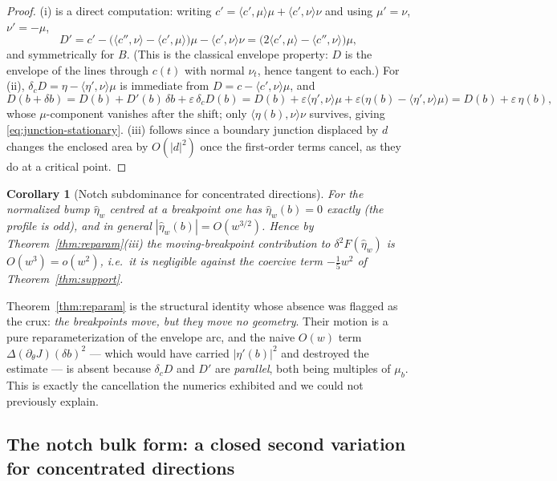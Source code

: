 \documentclass[11pt]{amsart}
\theoremstyle{plain}
\newtheorem{corollary}[theorem]{Corollary}
\theoremstyle{definition}
\begin{document}
\begin{proof}
(i) is a direct computation: writing $c' = \langle c',\mu\rangle\mu +
\langle c',\nu\rangle\nu$ and using $\mu'=\nu$, $\nu'=-\mu$,
\[
  D' = c' - \bigl(\langle c'',\nu\rangle-\langle c',\mu\rangle\bigr)\mu
       - \langle c',\nu\rangle\nu
     = \bigl(2\langle c',\mu\rangle-\langle c'',\nu\rangle\bigr)\mu ,
\]
and symmetrically for $B$.  (This is the classical envelope property:
$D$ is the envelope of the lines through $c(t)$ with normal $\nu_{t}$,
hence tangent to each.)  For (ii), $\delta_{c}D = \eta -
\langle\eta',\nu\rangle\mu$ is immediate from $D = c-\langle
c',\nu\rangle\mu$, and
\[
  D(b+\delta b) = D(b) + D'(b)\,\delta b + \varepsilon\,\delta_{c}D(b)
   = D(b) + \varepsilon\langle\eta',\nu\rangle\mu
     + \varepsilon\bigl(\eta(b)-\langle\eta',\nu\rangle\mu\bigr)
   = D(b) + \varepsilon\,\eta(b),
\]
whose $\mu$-component vanishes after the shift; only
$\langle\eta(b),\nu\rangle\nu$ survives, giving
\eqref{eq:junction-stationary}.  (iii) follows since a boundary junction
displaced by $d$ changes the enclosed area by $O(|d|^{2})$ once the
first-order terms cancel, as they do at a critical point.
\end{proof}

\begin{corollary}[Notch subdominance for concentrated directions]
\label{cor:notch-sub}
For the normalized bump $\hat\eta_{w}$ centred at a breakpoint one has
$\hat\eta_{w}(b)=0$ exactly (the profile is odd), and in general
$|\hat\eta_{w}(b)| = O(w^{3/2})$.  Hence by
Theorem~\ref{thm:reparam}(iii) the moving-breakpoint contribution to
$\delta^{2}F(\hat\eta_{w})$ is $O(w^{3}) = o(w^{2})$, i.e.\ it is
negligible against the coercive term $-\tfrac15 w^{2}$ of
Theorem~\ref{thm:support}.
\end{corollary}

Theorem~\ref{thm:reparam} is the structural identity whose absence was
flagged as the crux: \emph{the breakpoints move, but they move no
geometry}.  Their motion is a pure reparameterization of the envelope
arc, and the naive $O(w)$ term
$\Delta(\partial_{\theta}J)(\delta b)^{2}$ --- which would have carried
$|\eta'(b)|^{2}$ and destroyed the estimate --- is absent because
$\delta_{c}D$ and $D'$ are \emph{parallel}, both being multiples of
$\mu_{b}$.  This is exactly the cancellation the numerics exhibited and
we could not previously explain.

\subsection{The notch bulk form: a closed second variation for
concentrated directions}\label{sec:bulkform}
\end{document}
